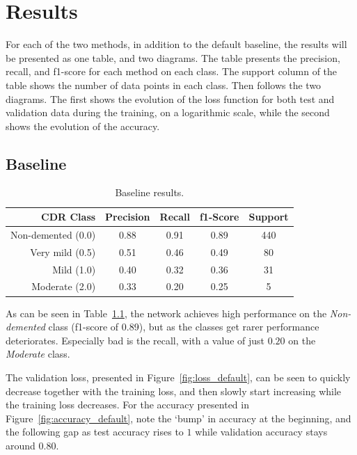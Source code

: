 \documentclass{kththesis}
\begin{document}
\chapter{Results}

For each of the two methods, in addition to the default baseline, the results will be presented as one table, and two diagrams. The table presents the precision, recall, and f1-score for each method on each class. The support column of the table shows the number of data points in each class. Then follows the two diagrams. The first shows the evolution of the loss function for both test and validation data during the training, on a logarithmic scale, while the second shows the evolution of the accuracy.

\section{Baseline}
\begin{table}[H]
  \begin{center}
    \caption{Baseline results. \label{tab:results_default}}
    \begin{tabular}{r|ccc|c}
      \textbf{CDR Class} & \textbf{Precision} & \textbf{Recall} & \textbf{f1-Score} & \textbf{Support} \\
      \toprule
      Non-demented (0.0) & 0.88 & 0.91 & 0.89 & 440 \\
      Very mild (0.5) & 0.51 & 0.46 & 0.49 & 80  \\
      Mild (1.0)         & 0.40 & 0.32 & 0.36 & 31  \\
      Moderate (2.0)     & 0.33 & 0.20 & 0.25 & 5   \\
    \end{tabular}
  \end{center}
\end{table}

As can be seen in Table~\ref{tab:results_default}, the network achieves high performance on the \textit{Non-demented} class (f1-score of 0.89), but as the classes get rarer performance deteriorates. Especially bad is the recall, with a value of just $0.20$ on the \textit{Moderate} class.

The validation loss, presented in Figure~\ref{fig:loss_default}, can be seen to quickly decrease together with the training loss, and then slowly start increasing while the training loss decreases. For the accuracy presented in Figure~\ref{fig:accuracy_default}, note the `bump' in accuracy at the beginning, and the following gap as test accuracy rises to $1$ while validation accuracy stays around $0.80$.
\end{document}
